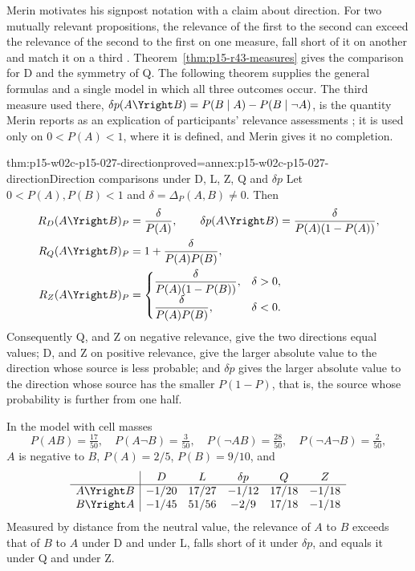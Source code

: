 Merin motivates his signpost notation with a claim about direction. For
two mutually relevant propositions, the relevance of the first to the
second can exceed the relevance of the second to the first on one
measure, fall short of it on another and match it on a third
\cite[p.~268]{Merin2021Relevance}.
Theorem~\ref{thm:p15-r43-measures} gives the comparison for D and the
symmetry of Q. The following theorem supplies the general formulas and
a single model in which all three outcomes occur. The third measure used
there, \(\delta p(A\Yright B)=P(B\mid A)-P(B\mid\neg A)\), is the
quantity Merin reports as an explication of participants' relevance
assessments \cite[p.~273]{Merin2021Relevance}; it is used only on
\(0<P(A)<1\), where it is defined, and Merin gives it no completion.

\begin{hbtheorem}{thm:p15-w02c-p15-027-direction}{proved=annex:p15-w02c-p15-027-direction}{Direction comparisons under D, L, Z, Q and \texorpdfstring{\(\delta p\)}{delta p}}
Let \(0<P(A),P(B)<1\) and \(\delta=\Delta_P(A,B)\ne0\). Then
\[
\begin{aligned}
 R_D(A\Yright B)_P&=\frac{\delta}{P(A)},\qquad
 \delta p(A\Yright B)=\frac{\delta}{P(A)(1-P(A))},\\
 R_Q(A\Yright B)_P&=1+\frac{\delta}{P(A)P(B)},\\
 R_Z(A\Yright B)_P&=
 \begin{cases}
  \dfrac{\delta}{P(A)(1-P(B))},&\delta>0,\\[1ex]
  \dfrac{\delta}{P(A)P(B)},&\delta<0.
 \end{cases}
\end{aligned}
\]
Consequently Q, and Z on negative relevance, give the two directions
equal values; D, and Z on positive relevance, give the larger absolute
value to the direction whose source is less probable; and \(\delta p\)
gives the larger absolute value to the direction whose source has the
smaller \(P(1-P)\), that is, the source whose probability is further
from one half.

In the model with cell masses
\[
 P(AB)=\tfrac{17}{50},\quad P(A\neg B)=\tfrac{3}{50},\quad
 P(\neg AB)=\tfrac{28}{50},\quad P(\neg A\neg B)=\tfrac{2}{50},
\]
\(A\) is negative to \(B\), \(P(A)=2/5\), \(P(B)=9/10\), and
\[
\begin{array}{c|ccccc}
 & D & L & \delta p & Q & Z\\\hline
 A\Yright B & -1/20 & 17/27 & -1/12 & 17/18 & -1/18\\
 B\Yright A & -1/45 & 51/56 & -2/9 & 17/18 & -1/18
\end{array}
\]
Measured by distance from the neutral value, the relevance of \(A\) to
\(B\) exceeds that of \(B\) to \(A\) under D and under L, falls short
of it under \(\delta p\), and equals it under Q and under Z.
\end{hbtheorem}

